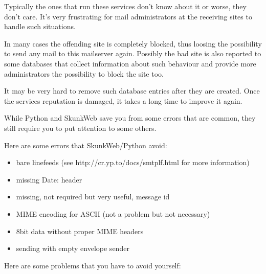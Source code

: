 \documentclass{article}
\begin{document}
Typically the ones that run these services don't know about it or worse,
they don't care. It's very frustrating for mail administrators at the
receiving sites to handle such situations.

In many cases the offending
site is completely blocked, thus loosing the possibility to send any
mail to this mailserver again. Possibly the bad site is also reported
to some databases that collect information about such behaviour and
provide more administrators the possibility to block the site too.

It may be very hard to remove such database entries after they are created.
Once the services reputation is damaged, it takes a long time to improve
it again.

While Python and SkunkWeb save you from some errors that are common,
they still require you to put attention to some others.

Here are some errors that SkunkWeb/Python avoid:

\begin{itemize}
  \item bare linefeeds (see http://cr.yp.to/docs/smtplf.html for more
        information)
  \item missing Date: header
  \item missing, not required but very useful, message id
  \item MIME encoding for ASCII (not a problem but not necessary)
  \item 8bit data without proper MIME headers
  \item sending with empty envelope sender
\end{itemize}

Here are some problems that you have to avoid yourself:
\end{document}
